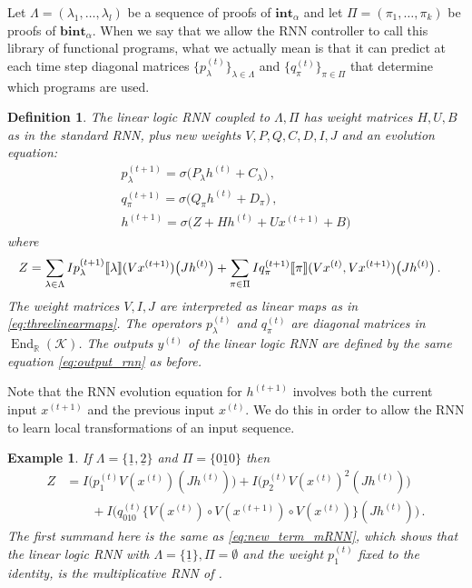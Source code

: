 \documentclass[english,letter paper,12pt,leqno]{article}
\theoremstyle{example}
\newtheorem{definition}[theorem]{Definition}
\newtheorem{example}[theorem]{Example}
\numberwithin{equation}{section}
\DeclareMathOperator{\End}{End}
\begin{document}
Let $\Lambda = (\lambda_1,\ldots,\lambda_l)$ be a sequence of proofs of $\textbf{int}_\alpha$ and let $\Pi = (\pi_1,\ldots,\pi_k)$ be proofs of $\textbf{bint}_\alpha$. When we say that we allow the RNN controller to call this library of functional programs, what we actually mean is that it can predict at each time step diagonal matrices $\{p^{(t)}_\lambda\}_{\lambda \in \Lambda}$ and $\{q^{(t)}_\pi\}_{\pi \in \Pi}$ that determine which programs are used.

\begin{definition} The \emph{linear logic} RNN coupled to $\Lambda, \Pi$ has weight matrices $H,U,B$ as in the standard RNN, plus new weights $V, P, Q, C, D, I, J$ and an evolution equation:
\begin{gather*}
p^{(t+1)}_\lambda = \sigma\big( P_\lambda h^{(t)} + C_\lambda \big)\,,\\
q^{(t+1)}_\pi = \sigma\big( Q_\pi h^{(t)} + D_\pi \big)\,,\\
h^{(t+1)} = \sigma\Big( Z + H h^{(t)} + U x^{(t+1)} + B\Big)
\end{gather*}
where
\begin{align*}
Z &= \sum_{\lambda \in \Lambda} Ip^{(t+1)}_\lambda\llbracket \lambda \rrbracket( Vx^{(t+1)} )\big( Jh^{(t)} \big) + \sum_{\pi \in \Pi} Iq^{(t+1)}_\pi\llbracket \pi \rrbracket( Vx^{(t)}, Vx^{(t+1)})\big( Jh^{(t)} \big)\,.
\end{align*}
The weight matrices $V,I,J$ are interpreted as linear maps as in \eqref{eq:threelinearmaps}. The operators $p^{(t)}_\lambda$ and $q^{(t)}_\pi$ are diagonal matrices in $\End_{\mathbb{R}}(\mathscr{K})$. The outputs $y^{(t)}$ of the linear logic RNN are defined by the same equation \eqref{eq:output_rnn} as before.
\end{definition}

Note that the RNN evolution equation for $h^{(t+1)}$ involves both the current input $x^{(t+1)}$ and the previous input $x^{(t)}$. We do this in order to allow the RNN to learn local transformations of an input sequence. %

\begin{example} If $\Lambda = \{ \underline{1}, \underline{2} \}$ and $\Pi = \{ \underline{010} \}$ then
\begin{align*}
Z &= I\big(p_1^{(t)} V(x^{(t)})( Jh^{(t)}) \big) + I\big( p_2^{(t)} V(x^{(t)})^2(J h^{(t)}) \big)\\
&\qquad + I\Big( q^{(t)}_{010} \big\{ V(x^{(t)}) \circ V(x^{(t+1)}) \circ V(x^{(t)}) \big\}( J h^{(t)}) \Big)\,.
\end{align*}
The first summand here is the same as \eqref{eq:new_term_mRNN}, which shows that the linear logic RNN with $\Lambda = \{ \underline{1} \}, \Pi = \emptyset$ and the weight $p^{(t)}_1$ fixed to the identity, is the multiplicative RNN of \cite{sutskever}.
\end{example}
\end{document}
